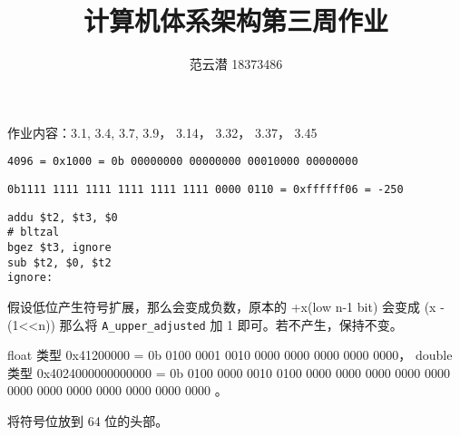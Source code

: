 \documentclass[lang=cn,11pt,a4paper,cite=authoryear]{elegantpaper}
\title{计算机体系架构\quad 第三周作业}
\author{范云潜 18373486}
\institute{微电子学院 184111 班}
\date{\zhtoday}
\begin{document}
\maketitle

作业内容：3.1, 3.4, 3.7, 3.9， 3.14， 3.32， 3.37， 3.45



\lstinline{4096 = 0x1000 = 0b 00000000 00000000 00010000 00000000 }


\lstinline{0b1111 1111 1111 1111 1111 1111 0000 0110 = 0xffffff06 = -250}


\begin{lstlisting}
addu $t2, $t3, $0
# bltzal 
bgez $t3, ignore
sub $t2, $0, $t2
ignore:
\end{lstlisting}


假设低位产生符号扩展，那么会变成负数，原本的 +x(low n-1 bit) 会变成 (x - (1<<n)) 那么将 \lstinline{A_upper_adjusted} 加 1 即可。若不产生，保持不变。







float 类型 0x41200000 = 0b 0100 0001 0010 0000 0000 0000 0000 0000， double 类型 0x4024000000000000 = 0b 0100 0000 0010  0100 0000 0000 0000 0000 0000 0000 0000 0000 0000 0000 0000 0000 。




将符号位放到 64 位的头部。

\end{document}
